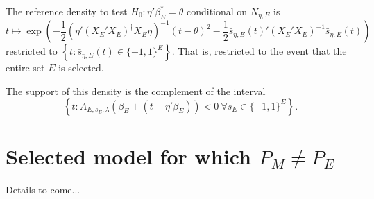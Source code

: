 \documentclass{article}
\newcommand{\OLS}{\bar{\beta}}
\begin{document}
        The reference density to test $H_0:\eta'\beta_E^*=\theta$
        conditional on $N_{\eta, E}$ is 
        $$
        t \mapsto
        \exp\left(-\frac{1}{2}\left(\eta'(X_E'X_E)^{\dagger}X_E\eta\right)^{-1}(t-\theta)^2 - \frac{1}{2} \bar{s}_{\eta,E}(t)' (X_E'X_E)^{-1} \bar{s}_{\eta,E}(t)\right)
        $$
        restricted to $\left\{t: \bar{s}_{\eta,E}(t) \in \{-1,1\}^E\right\}$. That is,
        restricted to the event that the entire set $E$ is selected.

        The support of this density is the complement of the interval
        $$
        \left\{t: A_{E,s_E,\lambda}(\OLS_E + (t - \eta'\OLS_E)) < 0 \ \forall s_E \in \{-1,1\}^E \right\}.
        $$
        
        \section{Selected model for which $P_M \neq P_E$}

        Details to come...
\end{document}
